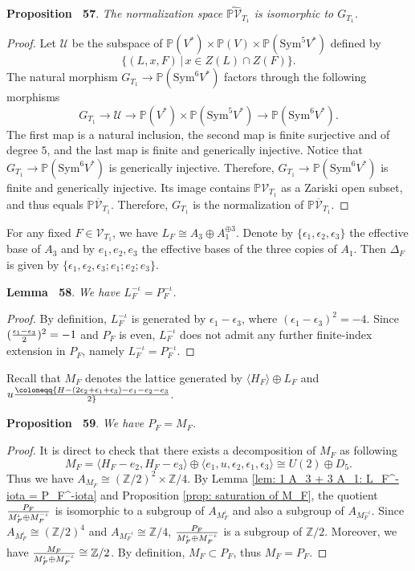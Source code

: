 \documentclass[
]{article}
\begin{document}
\textbf{Proposition~ 57}.
\emph{\label{prop: normalization for quintic plus 1 tangent} The
normalization space \(\widehat{\mathbb{P}\mathcal{V}}_{T_1}\) is
isomorphic to \(G_{T_1}\).}

\emph{Proof.} Let \(\mathcal{U}\) be the subspace of
\(\mathbb{P}(V^*)\times\mathbb{P}(V)\times\mathbb{P}(\mathrm{Sym}^5 V^*)\)
defined by \[\{ (L,x,F) \,|\, x\in Z(L)\cap Z(F) \}.\] The natural
morphism \(G_{T_1}\to \mathbb{P}(\mathrm{Sym}^6 V^*)\) factors through
the following morphisms
\[G_{T_1} \to \mathcal{U} \to \mathbb{P}(V^*)\times\mathbb{P}(\mathrm{Sym}^5 V^*) \to \mathbb{P}(\mathrm{Sym}^6 V^*).\]
The first map is a natural inclusion, the second map is finite
surjective and of degree \(5\), and the last map is finite and
generically injective. Notice that
\(G_{T_1}\to \mathbb{P}(\mathrm{Sym}^6 V^*)\) is generically injective.
Therefore, \(G_{T_1}\to \mathbb{P}(\mathrm{Sym}^6 V^*)\) is finite and
generically injective. Its image contains
\(\mathbb{P}\mathcal{V}_{T_1}\) as a Zariski open subset, and thus
equals \(\mathbb{P}\overline{\mathcal{V}}_{T_1}\). Therefore,
\(G_{T_1}\) is the normalization of
\(\mathbb{P}\overline{\mathcal{V}}_{T_1}\).~◻

For any fixed \(F\in\mathcal{V}_{T_1}\), we have
\(L_F\cong A_3\oplus A_1^{\oplus 3}\). Denote by
\(\{\epsilon_1,\epsilon_2,\epsilon_3\}\) the effective base of \(A_3\)
and by \(e_1,e_2,e_3\) the effective bases of the three copies of
\(A_1\). Then \(\Delta_F\) is given by
\(\{ \epsilon_1,\epsilon_2,\epsilon_3;e_1;e_2;e_3 \}\).

\textbf{Lemma~ 58}.
\emph{\label{lem: 1 A_3 + 3 A_1: L_F^-iota = P_F^-iota} We have
\(L_F^{-\iota} = P_F^{-\iota}\).}

\emph{Proof.} By definition, \(L_F^{-\iota}\) is generated by
\(\epsilon_1-\epsilon_3\), where \((\epsilon_1-\epsilon_3)^2=-4\). Since
\(({\epsilon_1-\epsilon_3\over2})^2=-1\) and \(P_F\) is even,
\(L_F^{-\iota}\) does not admit any further finite-index extension in
\(P_F\), namely \(L_F^{-\iota} = P_F^{-\iota}\).~◻

Recall that \(M_F\) denotes the lattice generated by
\(\langle H_F\rangle\oplus L_F\) and
\(u\coloneqq{H-(2\epsilon_2+\epsilon_1+\epsilon_3)-e_1-e_2-e_3\over2}\).

\textbf{Proposition~ 59}. \emph{\label{prop: 1 A_3 + 3 A_1: P=M} We have
\(P_F=M_F\).}

\emph{Proof.} It is direct to check that there exists a decomposition of
\(M_F\) as following
\[M_F = \langle H_F-e_2,H_F-e_3 \rangle \oplus \langle e_1,u,\epsilon_2,\epsilon_1,\epsilon_3 \rangle \cong U(2)\oplus D_5.\]
Thus we have \(A_{M_F}\cong (\mathbb{Z}/2)^2\times\mathbb{Z}/4\). By
Lemma \ref{lem: 1 A_3 + 3 A_1: L_F^-iota = P_F^-iota} and Proposition
\ref{prop: saturation of M_F}, the quotient
\(P_F\over{M_F^\iota\oplus M_F^{-\iota}}\) is isomorphic to a subgroup
of \(A_{M_F^\iota}\) and also a subgroup of \(A_{M_F^{-\iota}}\). Since
\(A_{M_F^\iota}\cong(\mathbb{Z}/2)^4\) and
\(A_{M_F^{-\iota}}\cong\mathbb{Z}/4\),
\(P_F\over{M_F^\iota\oplus M_F^{-\iota}}\) is a subgroup of
\(\mathbb{Z}/2\). Moreover, we have
\({M_F\over{M_F^\iota\oplus M_F^{-\iota}}}\cong\mathbb{Z}/2\). By
definition, \(M_F\subset P_F\), thus \(M_F=P_F\).~◻
\end{document}
